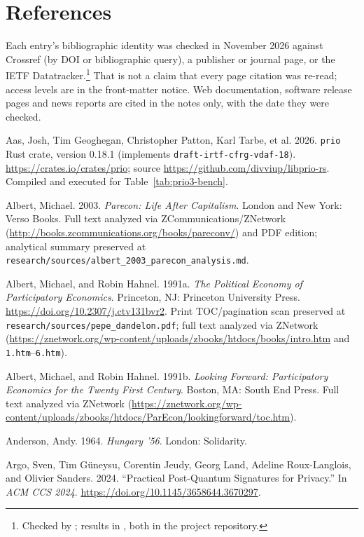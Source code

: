 \documentclass[10pt,twoside,openany]{book}
\theoremstyle{dpepstyle}
\begin{document}
\chapter{References}

Each entry's bibliographic identity was checked in November 2026 against Crossref (by DOI or bibliographic query), a publisher or journal page, or the IETF Datatracker.\footnote{Checked by ; results in , both in the project repository.} That is not a claim that every page citation was re-read; access levels are in the front-matter notice. Web documentation, software release pages and news reports are cited in the notes only, with the date they were checked.

\begin{list}{}{\setlength{\leftmargin}{1.8em}\setlength{\itemindent}{-1.8em}\setlength{\itemsep}{3pt}\setlength{\parsep}{0pt}}
\item Aas, Josh, Tim Geoghegan, Christopher Patton, Karl Tarbe, et al. 2026. \texttt{prio} Rust crate, version 0.18.1 (implements \texttt{draft-irtf-cfrg-vdaf-18}). \url{https://crates.io/crates/prio}; source \url{https://github.com/divviup/libprio-rs}. Compiled and executed for Table~\ref{tab:prio3-bench}.
\item Albert, Michael. 2003. \emph{Parecon: Life After Capitalism}. London and New York: Verso Books. Full text analyzed via ZCommunications/ZNetwork (\url{http://books.zcommunications.org/books/pareconv/}) and PDF edition; analytical summary preserved at \texttt{research/sources/albert\_2003\_parecon\_analysis.md}.
\item Albert, Michael, and Robin Hahnel. 1991a. \emph{The Political Economy of Participatory Economics}. Princeton, NJ: Princeton University Press. \url{https://doi.org/10.2307/j.ctv131bvr2}. Print TOC/pagination scan preserved at \texttt{research/sources/pepe\_dandelon.pdf}; full text analyzed via ZNetwork (\url{https://znetwork.org/wp-content/uploads/zbooks/htdocs/books/intro.htm} and \texttt{1.htm}--\texttt{6.htm}).
\item Albert, Michael, and Robin Hahnel. 1991b. \emph{Looking Forward: Participatory Economics for the Twenty First Century}. Boston, MA: South End Press. Full text analyzed via ZNetwork (\url{https://znetwork.org/wp-content/uploads/zbooks/htdocs/ParEcon/lookingforward/toc.htm}).
\item Anderson, Andy. 1964. \emph{Hungary '56}. London: Solidarity.
\item Argo, Sven, Tim G\"uneysu, Corentin Jeudy, Georg Land, Adeline Roux-Langlois, and Olivier Sanders. 2024. ``Practical Post-Quantum Signatures for Privacy.'' In \emph{ACM CCS 2024}. \url{https://doi.org/10.1145/3658644.3670297}.

\end{list}
\end{document}
